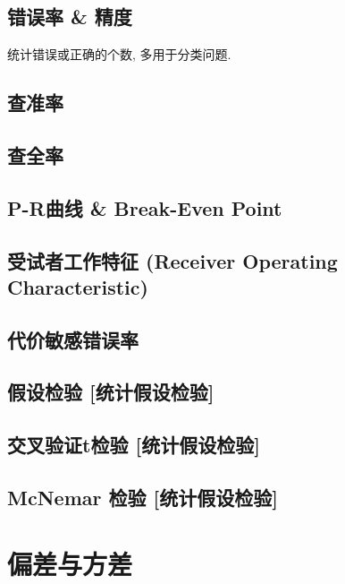 \documentclass[oneside]{book}
\begin{document}
			\subsection{错误率 \& 精度}
				统计错误或正确的个数, 多用于分类问题.
			\subsection{查准率}
			\subsection{查全率}
			\subsection{P-R曲线 \& Break-Even Point}
			\subsection{受试者工作特征 (Receiver Operating Characteristic)}
			\subsection{代价敏感错误率}
			\subsection{假设检验 [统计假设检验]}
			\subsection{交叉验证t检验 [统计假设检验]}
			\subsection{McNemar 检验 [统计假设检验]}
		\section{偏差与方差}
\end{document}
